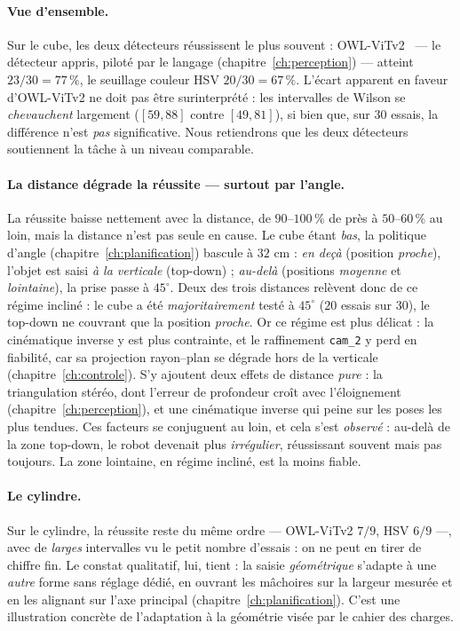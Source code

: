 \paragraph{Vue d'ensemble.} Sur le cube, les deux détecteurs réussissent le plus souvent : OWL-ViTv2~\cite{minderer_owlv2_2023} --- le détecteur appris, piloté par le langage (chapitre~\ref{ch:perception}) --- atteint $23/30 = 77\,\%$, le seuillage couleur HSV $20/30 = 67\,\%$. L'écart apparent en faveur d'OWL-ViTv2 ne doit pas être surinterprété : les intervalles de Wilson se \emph{chevauchent} largement ($[59, 88]$ contre $[49, 81]$), si bien que, sur $30$ essais, la différence n'est \emph{pas} significative. Nous retiendrons que les deux détecteurs soutiennent la tâche à un niveau comparable.

\paragraph{La distance dégrade la réussite --- surtout par l'angle.} La réussite baisse nettement avec la distance, de $90$--$100\,\%$ de près à $50$--$60\,\%$ au loin, mais la distance n'est pas seule en cause. Le cube étant \emph{bas}, la politique d'angle (chapitre~\ref{ch:planification}) bascule à $32$ cm : \emph{en deçà} (position \emph{proche}), l'objet est saisi \emph{à la verticale} (top-down) ; \emph{au-delà} (positions \emph{moyenne} et \emph{lointaine}), la prise passe à $45^{\circ}$. Deux des trois distances relèvent donc de ce régime incliné : le cube a été \emph{majoritairement} testé à $45^{\circ}$ ($20$ essais sur $30$), le top-down ne couvrant que la position \emph{proche}. Or ce régime est plus délicat : la cinématique inverse y est plus contrainte, et le raffinement \texttt{cam\_2} y perd en fiabilité, car sa projection rayon--plan se dégrade hors de la verticale (chapitre~\ref{ch:controle}). S'y ajoutent deux effets de distance \emph{pure} : la triangulation stéréo, dont l'erreur de profondeur croît avec l'éloignement (chapitre~\ref{ch:perception}), et une cinématique inverse qui peine sur les poses les plus tendues. Ces facteurs se conjuguent au loin, et cela s'est \emph{observé} : au-delà de la zone top-down, le robot devenait plus \emph{irrégulier}, réussissant souvent mais pas toujours. La zone lointaine, en régime incliné, est la moins fiable.

\paragraph{Le cylindre.} Sur le cylindre, la réussite reste du même ordre --- OWL-ViTv2 $7/9$, HSV $6/9$ ---, avec de \emph{larges} intervalles vu le petit nombre d'essais : on ne peut en tirer de chiffre fin. Le constat qualitatif, lui, tient : la saisie \emph{géométrique} s'adapte à une \emph{autre} forme sans réglage dédié, en ouvrant les mâchoires sur la largeur mesurée et en les alignant sur l'axe principal (chapitre~\ref{ch:planification}). C'est une illustration concrète de l'adaptation à la géométrie visée par le cahier des charges.

